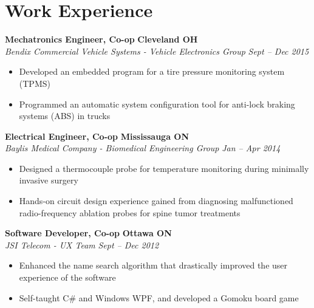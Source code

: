 \section*{Work Experience}
    \vspace{\postsubhead}
    \textbf{Mechatronics Engineer, Co-op}
    \hfill
    \textbf{Cleveland OH}\\
    \textit{Bendix Commercial Vehicle Systems - Vehicle Electronics Group}
    \hfill
    \textit{Sept -- Dec 2015}
    \begin{itemize}
        \item Developed an embedded program for a tire pressure monitoring system (TPMS)
        \item Programmed an automatic system configuration tool for anti-lock braking systems (ABS) in trucks
    \end{itemize}
    \vspace{\interlist}

    \textbf{Electrical Engineer, Co-op}
    \hfill
    \textbf{Mississauga ON}\\
    \textit{Baylis Medical Company - Biomedical Engineering Group}
    \hfill
    \textit{Jan -- Apr 2014}
    \begin{itemize}
        \item Designed a thermocouple probe for temperature monitoring during minimally invasive surgery
        \item Hands-on circuit design experience gained from diagnosing malfunctioned radio-frequency ablation probes for spine tumor treatments
    \end{itemize}
    \vspace{\interlist}
    
    \textbf{Software Developer, Co-op}
    \hfill
    \textbf{Ottawa ON}\\
    \textit{JSI Telecom - UX Team}
    \hfill
    \textit{Sept -- Dec 2012}
    \begin{itemize}
        \item Enhanced the name search algorithm that drastically improved the user experience of the software
        \item Self-taught C\# and Windows WPF, and developed a Gomoku board game
    \end{itemize}
    \vspace{\interlist}
    

